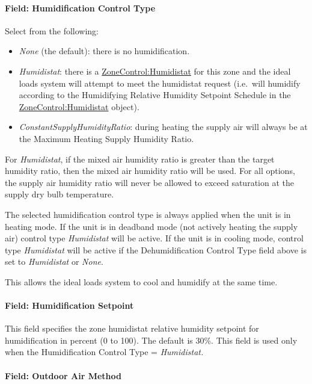 \paragraph{Field: Humidification Control Type}\label{field-humidification-control-type}

Select from the following:

\begin{itemize}
\item
  \emph{None} (the default): there is no humidification.
\item
  \emph{Humidistat}: there is a \hyperref[zonecontrolhumidistat]{ZoneControl:Humidistat} for this zone and the ideal loads system will attempt to meet the humidistat request (i.e.~will humidify according to the Humidifying Relative Humidity Setpoint Schedule in the \hyperref[zonecontrolhumidistat]{ZoneControl:Humidistat} object).
\item
  \emph{ConstantSupplyHumidityRatio}: during heating the supply air will always be at the Maximum Heating Supply Humidity Ratio.
\end{itemize}

For \emph{Humidistat}, if the mixed air humidity ratio is greater than the target humidity ratio, then the mixed air humidity ratio will be used. For all options, the supply air humidity ratio will never be allowed to exceed saturation at the supply dry bulb temperature.

The selected humidification control type is always applied when the unit is in heating mode. If the unit is in deadband mode (not actively heating the supply air) control type \emph{Humidistat} will be active. If the unit is in cooling mode, control type \emph{Humidistat} will be active if the Dehumidification Control Type field above is set to \emph{Humidistat} or \emph{None}.

This allows the ideal loads system to cool and humidify at the same time.

\paragraph{Field: Humidification Setpoint}\label{field-humidification-setpoint}

This field specifies the zone humidistat relative humidity setpoint for humidification in percent (0 to 100). The default is 30\%. This field is used only when the Humidification Control Type = \emph{Humidistat.}

\paragraph{Field: Outdoor Air Method}\label{field-outdoor-air-method-000}

